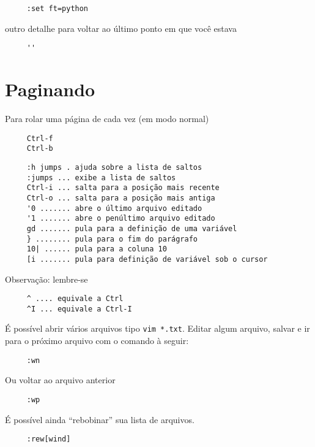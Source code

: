 \begin{verbatim}
     :set ft=python
\end{verbatim}

outro detalhe para voltar ao último ponto em que você estava

\begin{verbatim}
     ''
\end{verbatim}

\section{Paginando}
\label{Paginando}

Para rolar uma página de cada vez (em modo normal)

\begin{verbatim}
     Ctrl-f
     Ctrl-b
\end{verbatim}


\begin{verbatim}
     :h jumps . ajuda sobre a lista de saltos
     :jumps ... exibe a lista de saltos
     Ctrl-i ... salta para a posição mais recente
     Ctrl-o ... salta para a posição mais antiga
     '0 ....... abre o último arquivo editado
     '1 ....... abre o penúltimo arquivo editado
     gd ....... pula para a definição de uma variável
     } ........ pula para o fim do parágrafo
     10| ...... pula para a coluna 10
     [i ....... pula para definição de variável sob o cursor
\end{verbatim}

Observação: lembre-se

\begin{verbatim}
     ^ .... equivale a Ctrl
     ^I ... equivale a Ctrl-I
\end{verbatim}

É possível abrir vários arquivos tipo \verb|vim *.txt|. Editar
algum arquivo, salvar e ir para o próximo arquivo com o comando à
seguir:

\begin{verbatim}
     :wn
\end{verbatim}

Ou voltar ao arquivo anterior

\begin{verbatim}
     :wp
\end{verbatim}

É possível ainda ``rebobinar'' sua lista de arquivos.

\begin{verbatim}
     :rew[wind]
\end{verbatim}

